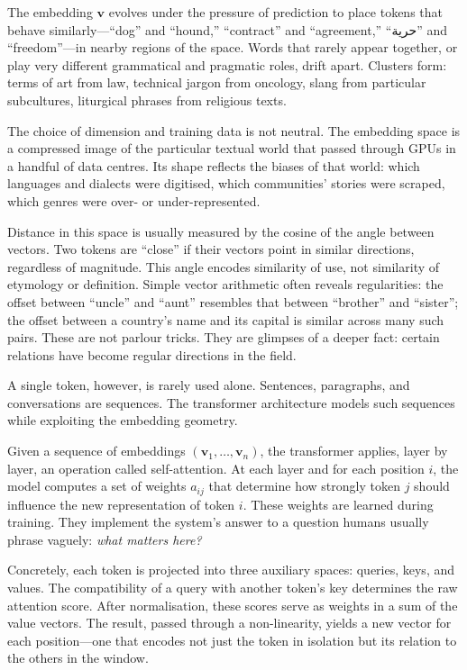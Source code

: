 \documentclass[12pt,a4paper]{report}
\begin{document}
The embedding $\mathbf{v}$ evolves under the pressure of prediction to place tokens that behave similarly---``dog'' and ``hound,'' ``contract'' and ``agreement,'' ``\textarabic{حرية}'' and ``freedom''---in nearby regions of the space. Words that rarely appear together, or play very different grammatical and pragmatic roles, drift apart. Clusters form: terms of art from law, technical jargon from oncology, slang from particular subcultures, liturgical phrases from religious texts.

The choice of dimension and training data is not neutral. The embedding space is a compressed image of the particular textual world that passed through GPUs in a handful of data centres. Its shape reflects the biases of that world: which languages and dialects were digitised, which communities' stories were scraped, which genres were over- or under-represented.

Distance in this space is usually measured by the cosine of the angle between vectors. Two tokens are ``close'' if their vectors point in similar directions, regardless of magnitude. This angle encodes similarity of use, not similarity of etymology or definition. Simple vector arithmetic often reveals regularities: the offset between ``uncle'' and ``aunt'' resembles that between ``brother'' and ``sister''; the offset between a country's name and its capital is similar across many such pairs. These are not parlour tricks. They are glimpses of a deeper fact: certain relations have become regular directions in the field.

A single token, however, is rarely used alone. Sentences, paragraphs, and conversations are sequences. The transformer architecture models such sequences while exploiting the embedding geometry.

Given a sequence of embeddings $(\mathbf{v}_1, \ldots, \mathbf{v}_n)$, the transformer applies, layer by layer, an operation called self-attention. At each layer and for each position $i$, the model computes a set of weights $a_{ij}$ that determine how strongly token $j$ should influence the new representation of token $i$. These weights are learned during training. They implement the system's answer to a question humans usually phrase vaguely: \emph{what matters here?}

Concretely, each token is projected into three auxiliary spaces: queries, keys, and values. The compatibility of a query with another token's key determines the raw attention score. After normalisation, these scores serve as weights in a sum of the value vectors. The result, passed through a non-linearity, yields a new vector for each position---one that encodes not just the token in isolation but its relation to the others in the window.
\end{document}
